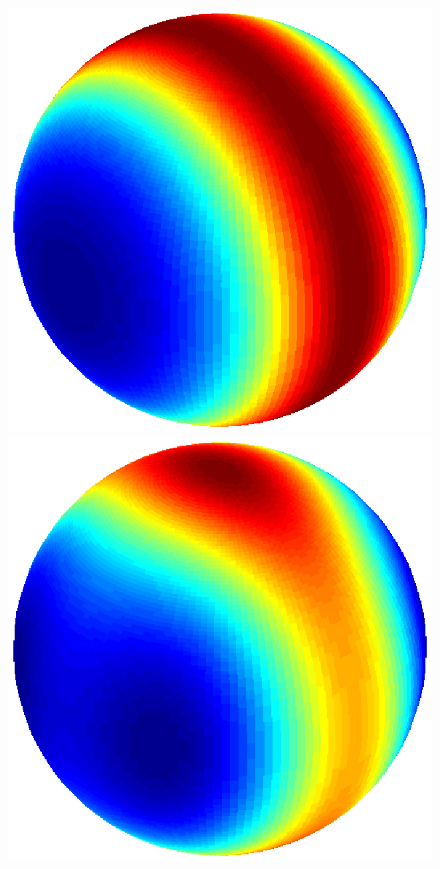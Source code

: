 \documentclass[dvips,aoas,preprint]{imsart}
\numberwithin{equation}{section}
\theoremstyle{plain}
\begin{document}
\begin{figure}[!htbp]
\begin{minipage}[]{0.12\textwidth}
    \end{minipage}
    \begin{minipage}[]{0.12\textwidth}
      \centering
      \includegraphics*[width=\textwidth]{figure4a1.eps}
    \end{minipage}
    \begin{minipage}[]{0.12\textwidth}
      \centering
      \includegraphics*[width=\textwidth]{figure4b1.eps}

\end{minipage}
\end{figure}
\end{document}
